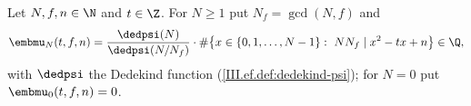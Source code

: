 Let $N,f,n\in\N$ and $t\in\Z$. For $N\ge1$ put $N_f=\gcd(N,f)$ and
\[
  \embmu_N(t,f,n)=\frac{\dedpsi(N)}{\dedpsi(N/N_f)}\cdot\#\bigl\{x\in\{0,1,\dots,N-1\}:\ N N_f\mid x^2-tx+n\bigr\}\in\Q,
\]
with $\dedpsi$ the Dedekind function (\cref{III.ef.def:dedekind-psi}); for $N=0$ put $\embmu_0(t,f,n)=0$.
